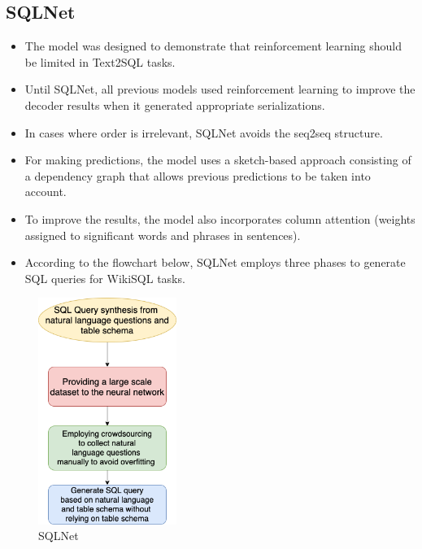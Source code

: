 \subsection*{SQLNet}

\begin{itemize}
    \item The model was designed to demonstrate that reinforcement learning should be limited in Text2SQL tasks.
    \item Until SQLNet, all previous models used reinforcement learning to improve the decoder results when it generated appropriate serializations.
    \item In cases where order is irrelevant, SQLNet avoids the seq2seq structure.
    \item For making predictions, the model uses a sketch-based approach consisting of a dependency graph that allows previous predictions to be taken into account.
    \item To improve the results, the model also incorporates column attention (weights assigned to significant words and phrases in sentences).
    \item According to the flowchart below, SQLNet employs three phases to generate SQL queries for WikiSQL tasks.
\end{itemize}

\begin{figure}[htb]
\centering
\includegraphics[width=0.4\textwidth]{pics/sqlnet/sqlnet.png}
\caption{SQLNet}
\label{fig:sqlnet}
\end{figure}

